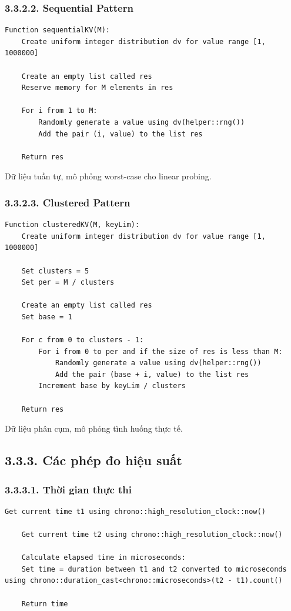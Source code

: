 \documentclass[12pt,a4paper]{report}
\begin{document}
\subsubsection*{3.3.2.2. Sequential Pattern}
\begin{lstlisting}[style=numbered]
Function sequentialKV(M):
    Create uniform integer distribution dv for value range [1, 1000000]

    Create an empty list called res
    Reserve memory for M elements in res

    For i from 1 to M:
        Randomly generate a value using dv(helper::rng())
        Add the pair (i, value) to the list res

    Return res
\end{lstlisting}
Dữ liệu tuần tự, mô phỏng worst-case cho linear probing.

\subsubsection*{3.3.2.3. Clustered Pattern}
\begin{lstlisting}[style=numbered]
Function clusteredKV(M, keyLim):
    Create uniform integer distribution dv for value range [1, 1000000]

    Set clusters = 5
    Set per = M / clusters

    Create an empty list called res
    Set base = 1

    For c from 0 to clusters - 1:
        For i from 0 to per and if the size of res is less than M:
            Randomly generate a value using dv(helper::rng())
            Add the pair (base + i, value) to the list res
        Increment base by keyLim / clusters

    Return res
\end{lstlisting}
Dữ liệu phân cụm, mô phỏng tình huống thực tế.

\subsection*{3.3.3. Các phép đo hiệu suất}

\subsubsection*{3.3.3.1. Thời gian thực thi}
\begin{lstlisting}[style=numbered]
    Get current time t1 using chrono::high_resolution_clock::now()

    Get current time t2 using chrono::high_resolution_clock::now()
    
    Calculate elapsed time in microseconds:
    Set time = duration between t1 and t2 converted to microseconds using chrono::duration_cast<chrono::microseconds>(t2 - t1).count()

    Return time
\end{lstlisting}
\end{document}
